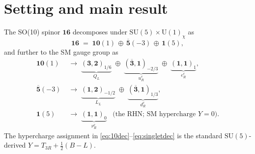 \section{Setting and main result}\label{sec:setup}
The SO(10) spinor $\mathbf{16}$ decomposes under
$\mathrm{SU}(5)\times\mathrm{U}(1)_\chi$ as
\begin{equation}\label{eq:16dec}
  \mathbf{16} \;=\; \mathbf{10}(1) \,\oplus\, \overline{\mathbf{5}}(-3) \,\oplus\, \mathbf{1}(5),
\end{equation}
and further to the SM gauge group as
\begin{align}
  \mathbf{10}(1) &\;\to\;
    \underbrace{(\mathbf{3},\mathbf{2})_{1/6}}_{Q_L}
    \;\oplus\;
    \underbrace{(\overline{\mathbf{3}},\mathbf{1})_{-2/3}}_{u_R^c}
    \;\oplus\;
    \underbrace{(\mathbf{1},\mathbf{1})_{1}}_{e_R^c}, \label{eq:10dec}\\
  \overline{\mathbf{5}}(-3) &\;\to\;
    \underbrace{(\mathbf{1},\mathbf{2})_{-1/2}}_{L_L}
    \;\oplus\;
    \underbrace{(\overline{\mathbf{3}},\mathbf{1})_{1/3}}_{d_R^c}, \label{eq:5bardec}\\
  \mathbf{1}(5) &\;\to\;
    \underbrace{(\mathbf{1},\mathbf{1})_{0}}_{\nu_R^c} \;\;\;
    \text{(the RHN; SM hypercharge $Y=0$).} \label{eq:singletdec}
\end{align}
The hypercharge assignment in \eqref{eq:10dec}--\eqref{eq:singletdec}
is the standard $\mathrm{SU}(5)$-derived
$Y = T_{3R} + \tfrac{1}{2}(B-L)$.

